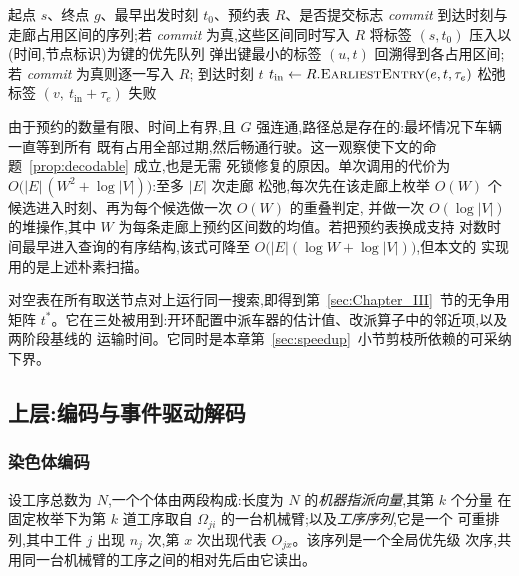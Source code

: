 \documentclass[manuscript,screen,review]{acmart}
\begin{document}
\begin{algorithm}[t]
\caption{\textsc{Route}:无冲突的单段路径规划}
\label{alg:route}
\small
\begin{algorithmic}[1]
\Require 起点 $s$、终点 $g$、最早出发时刻 $t_0$、预约表 $R$、是否提交标志 \textit{commit}
\Ensure 到达时刻与走廊占用区间的序列;若 \textit{commit} 为真,这些区间同时写入 $R$
\State 将标签 $(s,t_0)$ 压入以(时间,节点标识)为键的优先队列
  \State 弹出键最小的标签 $(u,t)$
   \State 回溯得到各占用区间;若 \textit{commit} 为真则逐一写入 $R$;
       \Return 到达时刻 $t$ \EndIf
    \State $t_{\text{in}} \gets R.\textsc{EarliestEntry}(e,t,\tau_e)$
    \State 松弛标签 $(v,\ t_{\text{in}}+\tau_e)$
  \EndFor
\EndWhile
\State \Return 失败 
\end{algorithmic}
\end{algorithm}

由于预约的数量有限、时间上有界,且 $G$ 强连通,路径总是存在的:最坏情况下车辆一直等到所有
既有占用全部过期,然后畅通行驶。这一观察使下文的命题~\ref{prop:decodable} 成立,也是无需
死锁修复的原因。单次调用的代价为 $O\bigl(|E|\,(W^{2}+\log|V|)\bigr)$:至多 $|E|$ 次走廊
松弛,每次先在该走廊上枚举 $O(W)$ 个候选进入时刻、再为每个候选做一次 $O(W)$ 的重叠判定,
并做一次 $O(\log|V|)$ 的堆操作,其中 $W$ 为每条走廊上预约区间数的均值。若把预约表换成支持
对数时间最早进入查询的有序结构,该式可降至 $O\bigl(|E|(\log W+\log|V|)\bigr)$,但本文的
实现用的是上述朴素扫描。

对空表在所有取送节点对上运行同一搜索,即得到第~\ref{sec:Chapter_III}~节的无争用矩阵
$t^{*}$。它在三处被用到:开环配置中派车器的估计值、改派算子中的邻近项,以及两阶段基线的
运输时间。它同时是本章第~\ref{sec:speedup}~小节剪枝所依赖的可采纳下界。

\subsection{上层:编码与事件驱动解码}
\label{sec:upper}

\subsubsection{染色体编码}
设工序总数为 $N$,一个个体由两段构成:长度为 $N$ 的\emph{机器指派向量},其第 $k$ 个分量
在固定枚举下为第 $k$ 道工序取自 $\Omega_{ji}$ 的一台机械臂;以及\emph{工序序列},它是一个
可重排列,其中工件 $j$ 出现 $n_j$ 次,第 $x$ 次出现代表 $O_{jx}$。该序列是一个全局优先级
次序,共用同一台机械臂的工序之间的相对先后由它读出。
\end{document}
